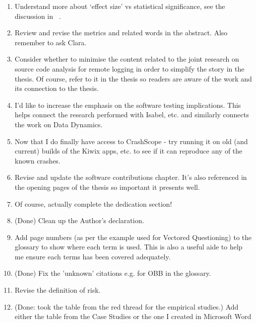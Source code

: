 \begin{enumerate}
    \item Understand more about `effect size' vs statistical significance, see the discussion in ~\citep[p.135]{Ko2015_a_practical_guide_to_controlled_experiments_of_sw_eng_tools_with_human_participants}.

    \item Review and revise the metrics and related words in the abstract. Also remember to ask Clara.

    \item Consider whether to minimise the content related to the joint research on source code analysis for remote logging in order to simplify the story in the thesis. Of course, refer to it in the thesis so readers are aware of the work and its connection to the thesis.

    \item I'd like to increase the emphasis on the software testing implications. This helps connect the research performed with Isabel, etc. and similarly connects the work on Data Dynamics.

    \item Now that I do finally have access to CrashScope - try running it on old (and current) builds of the Kiwix apps, etc. to see if it can reproduce any of the known crashes.

    \item Revise and update the software contributions chapter. It's also referenced in the opening pages of the thesis so important it presents well.

    \item Of course, actually complete the dedication section!

    \item (Done) Clean up the Author's declaration.

    \item Add page numbers (as per the example used for Vectored Questioning) to the glossary to show where each term is used. This is also a useful aide to help me ensure each terms has been covered adequately.

    \item (Done) Fix the 'unknown' citations e.g. for OBB in the glossary.

    \item Revise the definition of risk.

    \item (Done: took the table from the red thread for the empirical studies.) Add either the table from the Case Studies or the one I created in Microsoft Word 


\end{enumerate}
